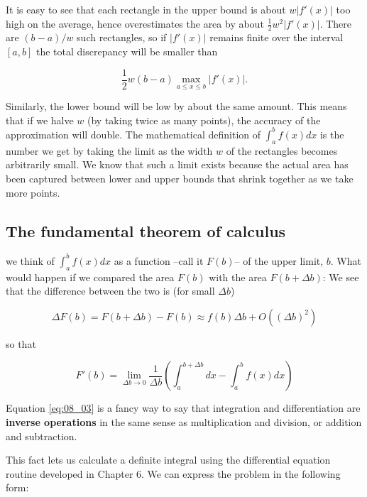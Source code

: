 It is easy to see that each rectangle in the upper bound is about $w\lvert f'(x)\rvert$ too high on the average, hence overestimates the area by about $\frac{1}{2}w^2\lvert f'(x)\rvert$. There are $(b-a)/w$ such rectangles, so if $\lvert f'(x)\rvert$ remains finite over the interval $[a, b]$ the total discrepancy will be smaller than

\begin{equation*}
\frac{1}{2}w(b-a) \max_{a\leq x \leq b} \lvert f'(x)\rvert.
\end{equation*}

Similarly, the lower bound will be low by about the same amount. This means that if we halve $w$ (by taking twice as many points), the accuracy of the approximation will double. The mathematical definition of $\int_{a}^{b} f(x) dx$ is the number we get by taking the limit as the width $w$ of the rectangles becomes arbitrarily small. We know that such a limit exists because the actual area has been captured between lower and upper bounds that shrink together as we take more points.

\subsection{The fundamental theorem of calculus}
 we think of $\int_{a}^{b}f(x) dx$ as a function --call it $F(b)$-- of the upper limit, $b$. What would happen if we compared the area $F(b)$ with the area $F(b + \Delta b)$: We see that the difference between the two is (for small $\Delta b$)

\begin{equation}
\Delta F(b) = F(b+\Delta b) - F(b) \approx f(b)\Delta b + O((\Delta b)^2) 
\end{equation}

so that

\begin{equation}
F'(b) = \lim_{\Delta b \to 0} \frac{1}{\Delta b} \left(\int_{a}^{b+\Delta b} dx - \int_{a}^{b}f(x) dx \right) \label{eq:08_03}
\end{equation}

Equation \ref{eq:08_03} is a fancy way to say that integration and differentiation are \textbf{inverse operations} in the same sense as multiplication and division, or addition and subtraction.

This fact lets us calculate a definite integral using the differential equation routine developed in Chapter 6. We can express the problem in the following form:

